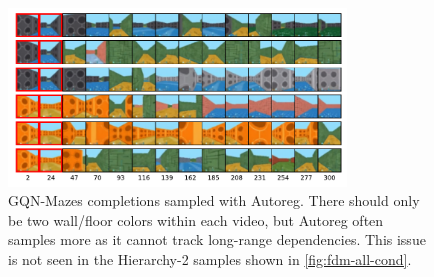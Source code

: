 \begin{figure}
    \centering
    \includegraphics[width=0.8\textwidth]{figs/fdm/mazes-autoreg.pdf}
    \vspace{-.25cm}
    \caption{GQN-Mazes completions sampled with Autoreg. There should only be two wall/floor colors within each video, but Autoreg often samples more as it cannot track long-range dependencies. This issue is not seen in the Hierarchy-2 samples shown in \cref{fig:fdm-all-cond}.}
    \label{fig:fdm-mazes-autoreg}
    \vspace{-.25cm}
\end{figure}


